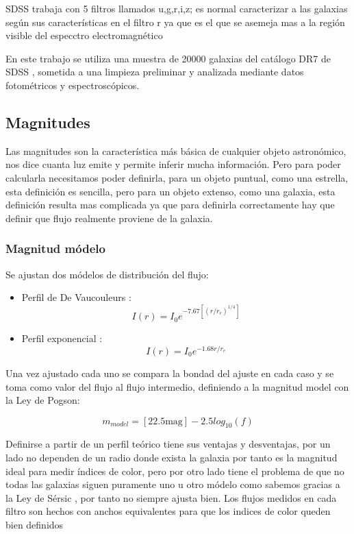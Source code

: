 \documentclass{article}
\begin{document}
SDSS trabaja con 5 filtros llamados u,g,r,i,z; es normal caracterizar a las galaxias según sus características en el filtro r ya que es el que se asemeja mas a la región visible del especctro electromagnético

En este trabajo se utiliza una muestra de 20000 galaxias del catálogo DR7 de SDSS \citep{SDSSDR7}, sometida a una limpieza preliminar y analizada mediante datos fotométricos y espectroscópicos.


\subsection{Magnitudes}
Las magnitudes son la característica más básica de cualquier objeto astronómico, nos dice cuanta luz emite y permite inferir mucha información. Pero para poder calcularla necesitamos poder definirla, para un objeto puntual, como una estrella, esta definición es sencilla, pero para un objeto extenso, como una galaxia, esta definición resulta mas complicada ya que para definirla correctamente hay que definir que flujo realmente proviene de la galaxia.

\subsubsection{Magnitud módelo}
Se ajustan dos módelos de distribución del flujo:
\begin{itemize}
	\item Perfil de De Vaucouleurs \citep{1948AnAp...11..247D}:  
	\begin{equation}
        I(r) = I_0 e^{-7.67 [(r/r_e)^{1/4}]}
    \end{equation}
   
	\item Perfil exponencial \citep{1970ApJ...160..811F}:
	\begin{equation}
        I(r) = I_0 e^{-1.68r/r_e}
    \end{equation}
\end{itemize}

Una vez ajustado cada uno se compara la bondad del ajuste en cada caso y se toma como valor del flujo al flujo intermedio, definiendo a la magnitud model con la Ley de Pogson: 

\begin{equation}
m_{model}= [22.5 \text{mag}] - 2.5 log_{10} (f)
\end{equation}

Definirse a partir de un perfil teórico tiene sus ventajas y desventajas, por un lado no dependen de un radio donde exista la galaxia por tanto es la magnitud ideal para medir índices de color, pero por otro lado tiene el problema de que no todas las galaxias siguen puramente uno u otro módelo como sabemos gracias a la Ley de Sérsic \citep{1963BAAA....6...41S}, por tanto no siempre ajusta bien.
Los flujos medidos en cada filtro son hechos con anchos equivalentes para que los indices de color queden bien definidos
\end{document}
